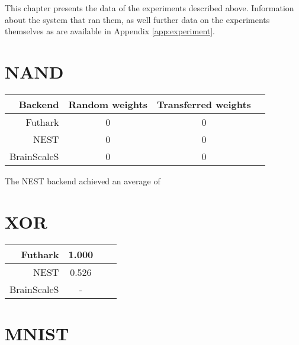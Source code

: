\documentclass[report.tex]{subfiles}
\begin{document}
This chapter presents the data of the experiments described above.
Information about the system that ran them, as well further data on
the experiments themselves as are available in Appendix
\ref{app:experiment}.

\section{NAND}

\begin{tabular}{r c c c}
\label{tab:nand}
Backend & Random weights & Transferred weights \\ \hline
Futhark & 0 & 0 \\
NEST & 0 & 0 \\ 
BrainScaleS & 0 & 0
\end{tabular}

The NEST backend achieved an average of 

\section{XOR}
\begin{tabular}{r c c c}
\caption{XOR experiment accuracies}
\label{tab:nand}
Futhark & 1.000 \\ \hline
NEST & 0.526 \\ \hline
BrainScaleS & -
\end{tabular}

\section{MNIST}
\end{document}
